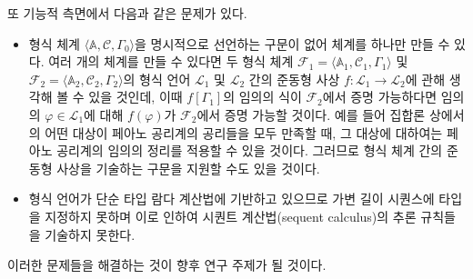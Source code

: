 \documentclass[10pt,twocolumn]{article}
\theoremstyle{definition}
\begin{document}
또 기능적 측면에서 다음과 같은 문제가 있다.

\begin{itemize}
	\item 형식 체계 $\langle\mathbb A, \mathcal C, \Gamma_0\rangle$을 명시적으로 선언하는 구문이 없어 체계를 하나만 만들 수 있다. 여러 개의 체계를 만들 수 있다면 두 형식 체계 $\mathcal F_1 = \langle\mathbb A_1, \mathcal C_1, \Gamma_1\rangle$ 및 $\mathcal F_2 = \langle\mathbb A_2, \mathcal C_2, \Gamma_2\rangle$의 형식 언어 $\mathcal L_1$ 및 $\mathcal L_2$ 간의 준동형 사상 $f: \mathcal L_1\to\mathcal L_2$에 관해 생각해 볼 수 있을 것인데, 이때 $f[\Gamma_1]$의 임의의 식이 $\mathcal F_2$에서 증명 가능하다면 임의의 $\varphi\in\mathcal L_1$에 대해 $f(\varphi)$가 $\mathcal F_2$에서 증명 가능할 것이다. 예를 들어 집합론 상에서의 어떤 대상이 페아노 공리계의 공리들을 모두 만족할 때, 그 대상에 대하여는 페아노 공리계의 임의의 정리를 적용할 수 있을 것이다. 그러므로 형식 체계 간의 준동형 사상을 기술하는 구문을 지원할 수도 있을 것이다.
	\item 형식 언어가 단순 타입 람다 계산법에 기반하고 있으므로 가변 길이 시퀀스에 타입을 지정하지 못하며 이로 인하여 시퀀트 계산법(sequent calculus)의 추론 규칙들을 기술하지 못한다.
\end{itemize}

이러한 문제들을 해결하는 것이 향후 연구 주제가 될 것이다.


\end{document}
